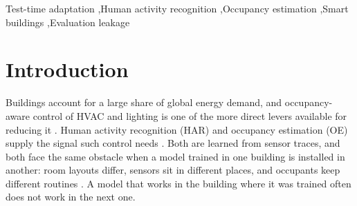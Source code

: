 \documentclass[a4paper,fleqn]{cas-dc}
\newcommand{\macf}{macro-F\textsubscript{1}}
\begin{document}
\begin{abstract}
Against that baseline all four methods act through one channel: replacing source
batch-normalisation statistics with the test stream's, which each released implementation
makes its primary mechanism. Disabling that channel and leaving everything else intact,
PETAL and PeTTA alter fewer than $25$ of $3412$ predictions, so their gradient updates,
posterior regularisation and divergence gating contribute almost nothing. Enabling it as
their own code configures it, PETAL lands within $0.3$ \macf{} points of plain AdaBN and
PeTTA within $1.1$. The cost of the channel rises monotonically with the share of target
statistics mixed in, and the only component that helps anywhere without target labels is
DIGA's prototype classifier, worth $4.4$ points in the direction with headroom and $-5.7$
in the direction without. Across two tasks, two directions and four methods, every method
gains $28$ to $43$ MCC points against a checkpoint worse than chance and loses against
every sound one. Our conclusion is not that TTA fails in smart buildings, but that it was
being asked to repair a problem largely created by evaluation and feature design.
\end{abstract}

\begin{keywords}
Test-time adaptation \sep Human activity recognition \sep Occupancy estimation
\sep Smart buildings \sep Evaluation leakage
\end{keywords}

\maketitle

\section{Introduction}
\label{sec:intro}

Buildings account for a large share of global energy demand, and occupancy-aware control
of HVAC and lighting is one of the more direct levers available for reducing it
\cite{manfren2021,amangeldy2025}. Human activity recognition (HAR) and occupancy
estimation (OE) supply the signal such control needs \cite{dridi2022,amayri2019}. Both are
learned from sensor traces, and both face the same obstacle when a model trained in one
building is installed in another: room layouts differ, sensors sit in different places,
and occupants keep different routines \cite{shahbazian2023,hong2017}. A model that works
in the building where it was trained often does not work in the next one.
\end{document}

